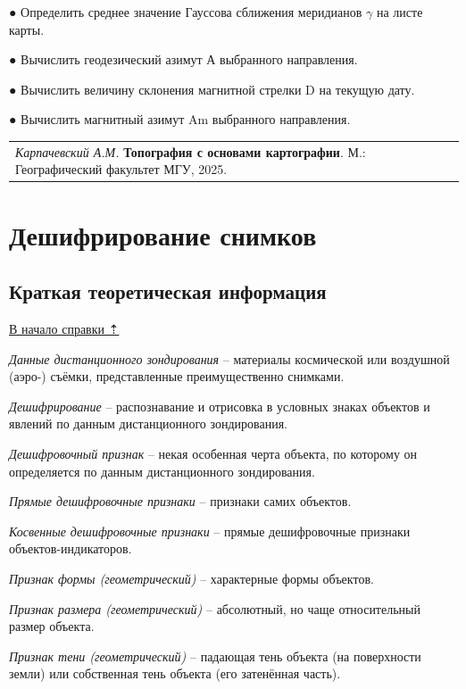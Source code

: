 \documentclass[
  12pt,
]{book}
\begin{document}
● Определить среднее значение Гауссова сближения меридианов \(\gamma\) на листе карты.

● Вычислить геодезический азимут А выбранного направления.

● Вычислить величину склонения магнитной стрелки D на текущую дату.

● Вычислить магнитный азимут Am выбранного направления.

\begin{longtable}[]{@{}l@{}}
\toprule\noalign{}
\endhead
\bottomrule\noalign{}
\endlastfoot
\emph{Карпачевский А.М.} \textbf{Топография с основами картографии}. М.: Географический факультет МГУ, 2025. \\
\end{longtable}

\chapter{Дешифрирование снимков}\label{interpretation}

\section{Краткая теоретическая информация}\label{interpretation-theory}

\hyperref[interpretation]{В начало справки ⇡}

\emph{Данные дистанционного зондирования} -- материалы космической или воздушной (аэро-) съёмки, представленные преимущественно снимками.

\emph{Дешифрирование} -- распознавание и отрисовка в условных знаках объектов и явлений по данным дистанционного зондирования.

\emph{Дешифровочный признак} -- некая особенная черта объекта, по которому он определяется по данным дистанционного зондирования.

\emph{Прямые дешифровочные признаки} -- признаки самих объектов.

\emph{Косвенные дешифровочные признаки} -- прямые дешифровочные признаки объектов-индикаторов.

\emph{Признак формы (геометрический)} -- характерные формы объектов.

\emph{Признак размера (геометрический)} -- абсолютный, но чаще относительный размер объекта.

\emph{Признак тени (геометрический)} -- падающая тень объекта (на поверхности земли) или собственная тень объекта (его затенённая часть).
\end{document}

